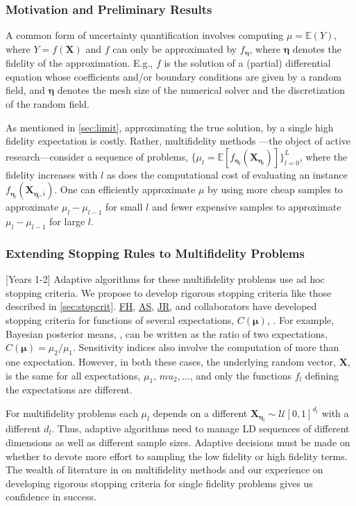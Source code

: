 \documentclass[11pt]{NSFamsart}
\newcommand{\FH}{\hyperlink{FHlink}{FH}\xspace}
\newcommand{\JR}{\hyperlink{JRlink}{JR}\xspace}
\newcommand{\AS}{\hyperlink{ASlink}{AS}\xspace}
\newcommand{\fidparam}{\bldeta}
\newcommand{\bbE}{\mathbb{E}}
\newcommand{\bX}{{\boldsymbol{X}}}
\newcommand{\bmu}{\boldsymbol{\mu}}
\newcommand{\bldeta}{{\boldsymbol{\eta}}}
\newcommand{\calu}{{\mathcal{U}}}
\begin{document}
\subsubsection{Motivation and Preliminary Results} A common form of uncertainty quantification involves computing $\mu = \bbE(Y)$, where $Y=f(\bX)$ and $f$ can only be approximated by $f_\fidparam$, where $\fidparam$ denotes the fidelity of the approximation.  E.g., $f$ is the solution of a (partial) differential equation whose coefficients and/or boundary conditions are given by a random field, and $\fidparam$ denotes the mesh size of the numerical solver and the discretization of the random field.  

As mentioned in \cref{sec:limit}, approximating the true solution, by a single high fidelity expectation is costly.  Rather, multifidelity methods \cite{Hei01a, Gil15a, HajNobTem16a}---the object of active research---consider a sequence of problems, $\{\mu_l =\bbE[f_{\fidparam_l}(\bX_{\fidparam_l})] \}_{l=0}^L$, where the fidelity increases with $l$ as does the computational cost of evaluating an instance $f_{\fidparam_l}(\bX_{\fidparam_l,i})$.  One can efficiently approximate $\mu$ by using more cheap samples to approximate $\mu_l - \mu_{l-1}$ for small $l$ and fewer  expensive samples to approximate $\mu_l - \mu_{l-1}$ for large $l$.

\subsubsection{Extending Stopping Rules to Multifidelity Problems}\label{sec:stopmulti} [Years 1-2]
Adaptive algorithms for these multifidelity problems use ad hoc stopping criteria.  We propose to develop  rigorous stopping criteria like those described in \cref{sec:stopcrit}.   \FH, \AS,  \JR, and collaborators have  developed stopping criteria for functions of several expectations, $C(\bmu)$, \cite{HicEtal17a, JagSor23a}.  For example, Bayesian posterior means, \cite{GelEtal13}, can be written as the ratio of two  expectations, $C(\bmu) = \mu_2/\mu_1$.  Sensitivity indices \cite{Sob01,Sal02a,SalEtal08a} also involve the  computation of more than one expectation.  However, in both these cases, the underlying random vector, $\bX$, is the same for all expectations, $\mu_1, \,mu_2, \dots$, and only the functions $f_l$ defining the expectations are different.

For multifidelity problems each $\mu_l$ depends on a different $\bX_{\fidparam_l} \sim \calu[0,1]^{d_l}$ with a different $d_l$.   Thus, adaptive algorithms need to manage LD sequences of different dimensions as well as different sample sizes.  Adaptive decisions must be made on whether to devote more effort to sampling the low fidelity or high fidelity terms.  The wealth of literature in on multifidelity methods and our experience on developing rigorous stopping criteria for single fidelity problems gives us confidence in success.
\end{document}
